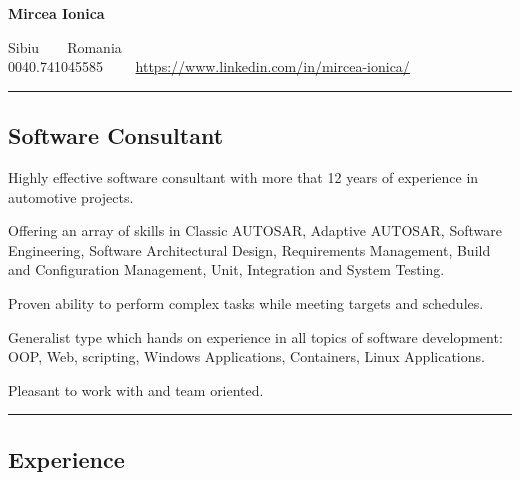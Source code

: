 \documentclass[10pt,letterpaper]{article}
\begin{document}
\begin{center}
{\LARGE \textbf{Mircea Ionica}}

Sibiu\ \ \textbullet\ \ Romania
\\
0040.741045585\ \ \textbullet
\ \ \url{https://www.linkedin.com/in/mircea-ionica/}
\end{center}


\hrule
\vspace{-0.4em}
\subsection*{Software Consultant}

\begin{flushleft}

Highly effective software consultant with more that 12 years of experience in automotive projects.

Offering an array of skills in Classic AUTOSAR, Adaptive AUTOSAR, Software Engineering, Software Architectural Design, Requirements Management, Build and Configuration Management, Unit, Integration and System Testing.

Proven ability to perform complex tasks while meeting targets and schedules.

Generalist type which hands on experience in all topics of software development: OOP, Web, scripting, Windows Applications, Containers, Linux Applications.

Pleasant to work with and team oriented.
\end{flushleft}



\hrule
\vspace{-0.4em}
\subsection*{Experience}
\end{document}
